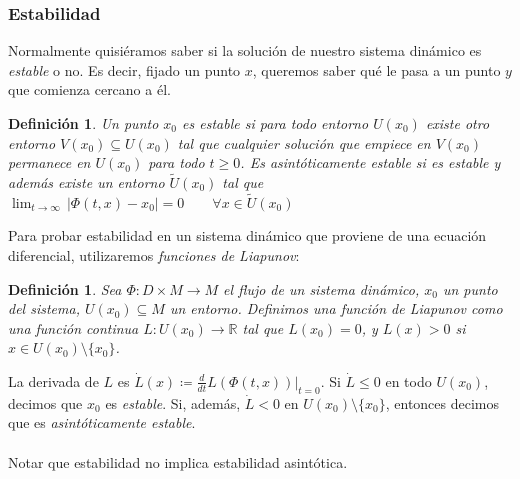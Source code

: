 \documentclass[12pt,a4paper]{article}
\newtheorem{definition}[theorem]{Definición}
\begin{document}
\subsubsection{Estabilidad}
Normalmente quisiéramos saber si la solución de nuestro sistema dinámico es \textit{estable} o no. Es decir, fijado un punto $x$, queremos saber qué le pasa a un punto $y$ que comienza cercano a él.
\begin{definition}
    Un punto $x_0$ es \textit{estable} si para todo entorno $U(x_0)$ existe otro entorno $V(x_0) \subseteq U(x_0)$ tal que cualquier solución que empiece en $V(x_0)$ permanece en $U(x_0)$ para todo $t\geq 0$. Es \textit{asintóticamente estable} si es estable y además existe un entorno $\tilde U(x_0)$ tal que $\displaystyle \lim_{t\rightarrow\infty} \, |\Phi(t,x) - x_0| = 0 \qquad \forall x \in \tilde U(x_0)$
\end{definition}
Para probar estabilidad en un sistema dinámico que proviene de una ecuación diferencial, utilizaremos \textit{funciones de Liapunov}:
\begin{definition}
    Sea $\Phi: D \times M \rightarrow M$ el flujo de un sistema dinámico, $x_0$ un punto del sistema, $U(x_0) \subseteq M$ un entorno. Definimos una función de Liapunov como una función continua $L: U(x_0) \to \mathbb{R}$ tal que $L(x_0) = 0$, y $L(x) > 0$ si $x \in U(x_0) \setminus \{x_0\}$.
\end{definition}
La derivada de $L$ es $\displaystyle \dot{L}(x) \coloneqq \frac{d}{dt} L(\Phi(t,x))|_{t=0}$. Si $\dot{L} \leq 0$ en todo $U(x_0)$, decimos que $x_0$ es \textit{estable}. Si, además, $\dot{L} < 0$ en $U(x_0) \setminus \{x_0\}$, entonces decimos que es \textit{asintóticamente estable}.
\\
\\
Notar que estabilidad no implica estabilidad asintótica.
\\
\\
\end{document}
